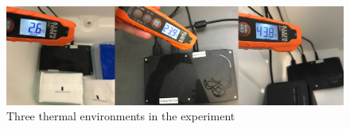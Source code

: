 \begin{figure}
\includegraphics[width=\textwidth]{figures/thermal.jpg}
\caption{Three thermal environments in the experiment} \label{cold}
\end{figure}

\subsection{}
 